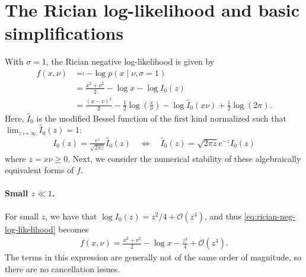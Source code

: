 \documentclass{article}
\begin{document}
\section{The Rician log-likelihood and basic simplifications}

With $\sigma=1$, the Rician negative log-likelihood is given by
%
\begin{align}
  f(x, \nu) & \eqqcolon -\log p(x \mid \nu, \sigma=1)                                                                                                                        \\
            & = \frac{x^2 + \nu^2}{2} - \log x - \log I_0(z) \label{eq:rician-neg-log-likelihood}                                                                            \\
            & = \frac{(x-\nu)^2}{2} - \frac{1}{2}\log\left(\frac{x}{\nu}\right) - \log \hat{I}_0(x \nu) + \frac{1}{2}\log(2\pi). \label{eq:rician-neg-log-likelihood-scaled}
\end{align}
%
Here, $\hat{I}_0$ is the modified Bessel function of the first kind normalized such that $\lim_{z \mapsto \infty} \hat{I}_0(z) = 1$:
%
\begin{align}
  I_0(z) = \frac{e^z}{\sqrt{2\pi z}} \hat{I}_0(z) \quad \Leftrightarrow \quad \hat{I}_0(z) = \sqrt{2\pi z} e^{-z} I_0(z)
\end{align}
%
where $z = x\nu \ge 0$.
Next, we consider the numerical stability of these algebraically equivalent forms of $f$.

\paragraph{Small $z \ll 1$.}

For small $z$, we have that $\log I_0(z) = z^2/4 + \mathcal{O}(z^4)$, and thus \cref{eq:rician-neg-log-likelihood} becomes
%
\begin{align}
  f(x, \nu) = \frac{x^2 + \nu^2}{2} - \log x - \frac{z^2}{4} + \mathcal{O}(z^4).
\end{align}
%
The terms in this expression are generally not of the same order of magnitude, so there are no cancellation issues.
\end{document}
